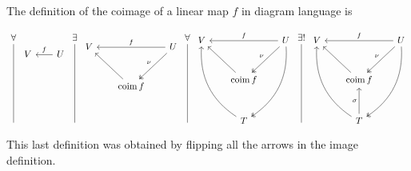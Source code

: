\documentclass[12pt]{amsart}
\theoremstyle{definition}
\DeclareMathOperator{\coim}{\mathrm{coim}}
\begin{document}
\begin{enumerate}[start=0]
The definition of the coimage of a linear map $f$ in diagram language is

\[
    \begin{tikzcd}[row sep=1cm, column sep=.7cm]
     \forall\arrow[ddd, dash]\\
     \\
     \\
     \;
    \end{tikzcd} 
    \begin{tikzcd}[row sep=1cm, column sep=.65cm]
     V& U\arrow[l,"f"']\\
     &\\
     &
    \end{tikzcd}
    \begin{tikzcd}[row sep=1cm, column sep=.7cm]
     \exists\arrow[ddd, dash]\\
     \\
     \\
     \;
    \end{tikzcd} 
    \begin{tikzcd}[row sep=1cm, column sep=.65cm]
     V&& U\arrow[ll,"f"']\\
     &\coim f\arrow[ul]\arrow[ur, twoheadleftarrow, "\nu"]&\\ %
     & & 
    \end{tikzcd}
    \begin{tikzcd}[row sep=1cm, column sep=.7cm]
     \forall\arrow[ddd, dash,]\\
     \\
     \\
     \;
    \end{tikzcd}
    \begin{tikzcd}[row sep=1cm, column sep=.65cm]
     V&& U\arrow[ll,"f"']\\
     &\coim f\arrow[ul]\arrow[ur, twoheadleftarrow, "\nu"]&\\
     &T\arrow[uul, bend left]\arrow[uur, twoheadleftarrow, bend right]& %
    \end{tikzcd}
    \begin{tikzcd}[row sep=1cm, column sep=.7cm]
     \exists!\arrow[ddd, dash]\\
     \\
     \\
     \;
    \end{tikzcd}
    \begin{tikzcd}[row sep=1cm, column sep=.65cm]
     V&& U\arrow[ll,"f"']\\
     &\coim f\arrow[ul]\arrow[ur, twoheadleftarrow, "\nu"]&\\ 
     &T\arrow[uul, bend left]\arrow[uur, twoheadleftarrow, bend right]\arrow[u, rightarrow, "\sigma"]&
    \end{tikzcd}
    \]
    This last definition was obtained by flipping all the arrows in the image definition.\\



\end{enumerate}
\end{document}
